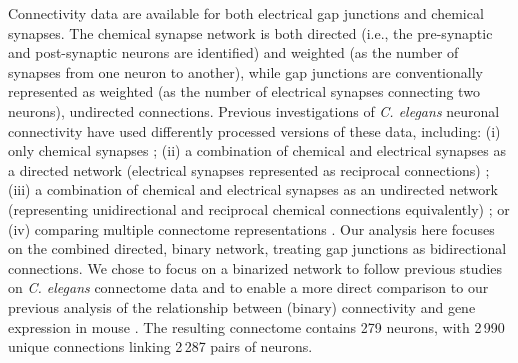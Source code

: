 \documentclass[10pt,letterpaper]{article}
\begin{document}
Connectivity data are available for both electrical gap junctions and chemical synapses.
The chemical synapse network is both directed (i.e., the pre-synaptic and post-synaptic neurons are identified) and weighted (as the number of synapses from one neuron to another), while gap junctions are conventionally represented as weighted (as the number of electrical synapses connecting two neurons), undirected connections.
Previous investigations of \emph{C. elegans} neuronal connectivity have used differently processed versions of these data, including:
(i) only chemical synapses \cite{Kashtan:2004ev};
(ii) a combination of chemical and electrical synapses as a directed network (electrical synapses represented as reciprocal connections) \cite{Azulay:2016cg, Kim:2016gl};
(iii) a combination of chemical and electrical synapses as an undirected network (representing unidirectional and reciprocal chemical connections equivalently) \cite{Towlson2013, Kim:2014bu, Pavlovic:2014gx, van2017guiding};
or (iv) comparing multiple connectome representations \cite{Pan:2010jt}.
Our analysis here focuses on the combined directed, binary network, treating gap junctions as bidirectional connections.
\color{teal}
We chose to focus on a binarized network to follow previous studies on \textit{C. elegans} connectome data \cite{Kaufman2006, Towlson2013, Varier2011, Varadan2006, Pavlovic:2014gx} and to enable a more direct comparison to our previous analysis of the relationship between (binary) connectivity and gene expression in mouse \cite{Fulcher:2016ck}.
\color{black}
The resulting connectome contains 279 neurons, with 2\,990 unique connections linking 2\,287 pairs of neurons.
\end{document}
